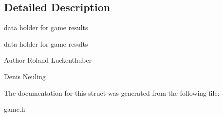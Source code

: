 \subsection{\-Detailed \-Description}
data holder for game results 

data holder for game results

\begin{DoxyAuthor}{\-Author}
\-Roland \-Luckenthuber 

\-Denis \-Neuling 
\end{DoxyAuthor}


\-The documentation for this struct was generated from the following file\-:\begin{DoxyCompactItemize}
\item 
game.\-h\end{DoxyCompactItemize}

